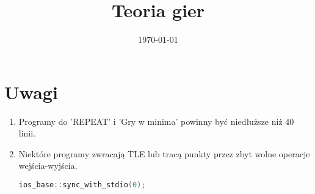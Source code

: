 \documentclass[paper=a4, fontsize=11pt]{article}
\title{	
\huge Teoria gier
}
\date{\normalsize\today}
\begin{document}
\maketitle

\newtheorem{mydef}{Definicja}
\newtheorem{theorem}{Twierdzenie}
\newtheorem{lemma}{Lemat}

\section{Uwagi}
\begin{enumerate}
\item Programy do 'REPEAT' i 'Gry w minima' powinny być niedłuższe niż 40 linii.
\item Niektóre programy zwracają TLE lub tracą punkty przez zbyt wolne operacje wejścia-wyjścia.
\begin{lstlisting}[language=c++]
ios_base::sync_with_stdio(0);
\end{lstlisting}
\end{enumerate}
\end{document}
